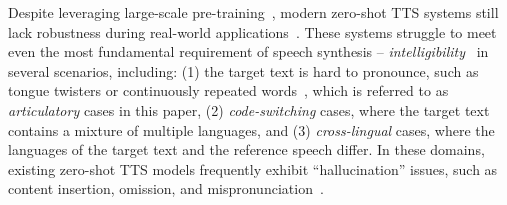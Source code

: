 \documentclass[11pt]{article}
\newcommand{\note}[1]{\textcolor{blue}{{#1}}}
\begin{document}
Despite leveraging large-scale pre-training~\cite{seedtts,maskgct,cosyvoice2}, modern zero-shot TTS systems still lack robustness during real-world applications~\cite{hallucination-survey,robustness-problem}. These systems struggle to meet even the most fundamental requirement of speech synthesis -- \textit{intelligibility}~\cite{tts-book-tanxu} in several scenarios, including: (1) the target text is hard to pronounce, such as tongue twisters or continuously repeated words~\cite{robustness-problem,seedtts}, which is referred to as \textit{articulatory} cases in this paper, (2) \textit{code-switching} cases, where the target text contains a mixture of multiple languages, and (3) \textit{cross-lingual} cases, where the languages of the target text and the reference speech differ. In these domains, existing zero-shot TTS models frequently exhibit ``hallucination'' issues, such as content insertion, omission, and mispronunciation~\cite{robustness-problem,valle}.



\end{document}
